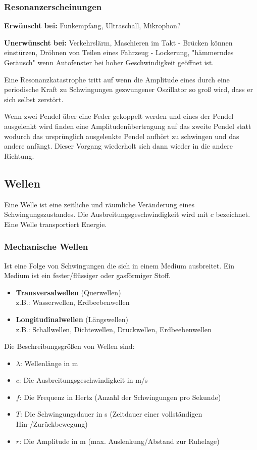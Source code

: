 \documentclass[../document.tex]{subfiles}
\begin{document}
\subsubsection{Resonanzerscheinungen}
\textbf{Erwünscht bei:} Funkempfang, Ultraschall, Mikrophon?

\textbf{Unerwünscht bei:} Verkehrslärm, Maschieren im Takt - Brücken können einstürzen, Dröhnen von Teilen eines Fahrzeug - Lockerung, "hämmerndes Geräusch" wenn Autofenster bei hoher Geschwindigkeit geöffnet ist.

Eine Resonanzkatastrophe tritt auf wenn die Amplitude eines durch eine periodische Kraft zu Schwingungen gezwungener Oszillator so groß wird, dass er sich selbst zerstört.

Wenn zwei Pendel über eine Feder gekoppelt werden und eines der Pendel ausgelenkt wird finden eine Amplitudenübertragung auf das zweite Pendel statt wodurch das ursprünglich ausgelenkte Pendel aufhört zu schwingen und das andere anfängt. Dieser Vorgang wiederholt sich dann wieder in die andere Richtung.

\subsection{Wellen}
Eine Welle ist eine zeitliche und räumliche Veränderung eines Schwingungszustandes. Die Ausbreitungsgeschwindigkeit wird mit $c$ bezeichnet. Eine Welle transportiert Energie.
\subsubsection{Mechanische Wellen}
Ist eine Folge von Schwingungen die sich in einem Medium ausbreitet. Ein Medium ist ein fester/flüssiger oder gasförmiger Stoff.

\begin{itemize}
	\item \textbf{Transversalwellen} (Querwellen)\\
	z.B.: Wasserwellen, Erdbeebenwellen
	\item \textbf{Longitudinalwellen} (Längswellen)\\
	z.B.: Schallwellen, Dichtewellen, Druckwellen, Erdbeebenwellen
\end{itemize}

Die Beschreibungsgrößen von Wellen sind:
\begin{itemize}
	\item $\lambda$: Wellenlänge in m
	\item $c$: Die Ausbreitungsgeschwindigkeit in m/s
	\item $f$: Die Frequenz in Hertz (Anzahl der Schwingungen pro Sekunde)
	\item $T$: Die Schwingungsdauer in s (Zeitdauer einer vollständigen Hin-/Zurückbewegung)
	\item $r$: Die Amplitude in m (max. Auslenkung/Abstand zur Ruhelage)
\end{itemize}
\end{document}
